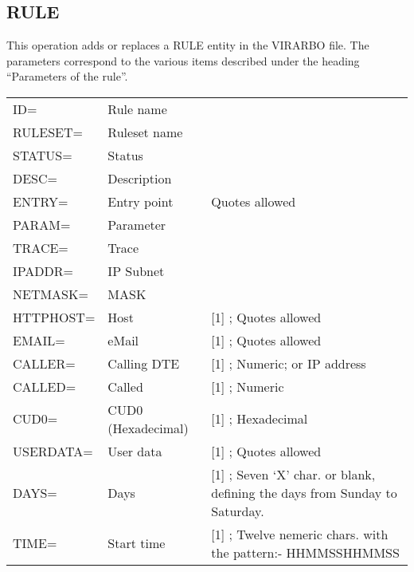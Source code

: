 \documentclass[letterpaper,10pt,english]{sphinxmanual}
\begin{document}

\subsection{RULE}
\label{\detokenize{Installation_Guide:rule}}\label{\detokenize{Installation_Guide:index-36}}
This operation adds or replaces a RULE entity in the VIRARBO file. The parameters correspond to the various items described under the heading “Parameters of the rule”.


\begin{savenotes}\sphinxattablestart
\centering
\begin{tabulary}{\linewidth}[t]{|T|T|T|}
\hline
{}\relax &\relax &\relax \\
\hline
ID=
&
Rule name
&\\
\hline
RULESET=
&
Ruleset name
&\\
\hline
STATUS=
&
Status
&\\
\hline
DESC=
&
Description
&\\
\hline
ENTRY=
&
Entry point
&
Quotes allowed
\\
\hline
PARAM=
&
Parameter
&\\
\hline
TRACE=
&
Trace
&\\
\hline
IPADDR=
&
IP Subnet
&\\
\hline
NETMASK=
&
MASK
&\\
\hline
HTTPHOST=
&
Host
&
{[}1{]} ; Quotes allowed
\\
\hline
EMAIL=
&
eMail
&
{[}1{]} ; Quotes allowed
\\
\hline
CALLER=
&
Calling DTE
&
{[}1{]} ; Numeric; or IP address
\\
\hline
CALLED=
&
Called
&
{[}1{]} ; Numeric
\\
\hline
CUD0=
&
CUD0 (Hexadecimal)
&
{[}1{]} ; Hexadecimal
\\
\hline
USERDATA=
&
User data
&
{[}1{]} ; Quotes allowed
\\
\hline
DAYS=
&
Days
&
{[}1{]} ; Seven ‘X’ char. or blank, defining the days
from Sunday to Saturday.
\\
\hline
TIME=
&
Start time
&
{[}1{]} ; Twelve nemeric chars. with the pattern:-
HHMMSSHHMMSS
\\
\hline
\end{tabulary}
\par
\sphinxattableend\end{savenotes}
\end{document}
